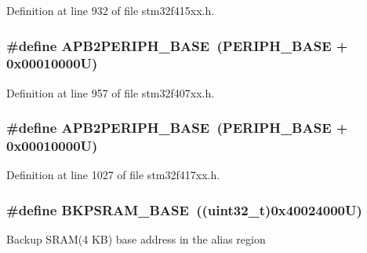 Definition at line 932 of file stm32f415xx.\+h.

\subsubsection[{\texorpdfstring{A\+P\+B2\+P\+E\+R\+I\+P\+H\+\_\+\+B\+A\+SE}{APB2PERIPH_BASE}}]{\setlength{\rightskip}{0pt plus 5cm}\#define A\+P\+B2\+P\+E\+R\+I\+P\+H\+\_\+\+B\+A\+SE~({\bf P\+E\+R\+I\+P\+H\+\_\+\+B\+A\+SE} + 0x00010000\+U)}\hypertarget{group___peripheral__registers__structures_ga25b99d6065f1c8f751e78f43ade652cb}{}\label{group___peripheral__registers__structures_ga25b99d6065f1c8f751e78f43ade652cb}


Definition at line 957 of file stm32f407xx.\+h.

\subsubsection[{\texorpdfstring{A\+P\+B2\+P\+E\+R\+I\+P\+H\+\_\+\+B\+A\+SE}{APB2PERIPH_BASE}}]{\setlength{\rightskip}{0pt plus 5cm}\#define A\+P\+B2\+P\+E\+R\+I\+P\+H\+\_\+\+B\+A\+SE~({\bf P\+E\+R\+I\+P\+H\+\_\+\+B\+A\+SE} + 0x00010000\+U)}\hypertarget{group___peripheral__registers__structures_ga25b99d6065f1c8f751e78f43ade652cb}{}\label{group___peripheral__registers__structures_ga25b99d6065f1c8f751e78f43ade652cb}


Definition at line 1027 of file stm32f417xx.\+h.

\subsubsection[{\texorpdfstring{B\+K\+P\+S\+R\+A\+M\+\_\+\+B\+A\+SE}{BKPSRAM_BASE}}]{\setlength{\rightskip}{0pt plus 5cm}\#define B\+K\+P\+S\+R\+A\+M\+\_\+\+B\+A\+SE~((uint32\+\_\+t)0x40024000\+U)}\hypertarget{group___peripheral__registers__structures_ga52e57051bdf8909222b36e5408a48f32}{}\label{group___peripheral__registers__structures_ga52e57051bdf8909222b36e5408a48f32}
Backup S\+R\+A\+M(4 K\+B) base address in the alias region 

